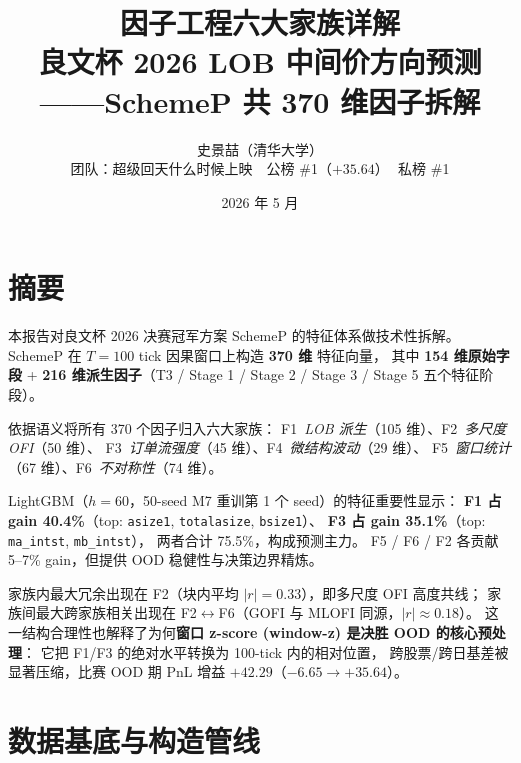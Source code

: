 \documentclass[10.5pt,a4paper]{article}
\title{\color{icmlblue}\textbf{因子工程六大家族详解}\\
\large 良文杯 2026 LOB 中间价方向预测——SchemeP 共 370 维因子拆解}
\author{史景喆（清华大学）\\
\small 团队：超级回天什么时候上映 \,\textbar\, 公榜 \#1（$+35.64$）\,\textbar\, 私榜 \#1}
\date{2026 年 5 月}
\begin{document}
\maketitle

\section{摘要}

本报告对良文杯 2026 决赛冠军方案 SchemeP 的特征体系做技术性拆解。
SchemeP 在 $T=100$ tick 因果窗口上构造 \textbf{370 维} 特征向量，
其中 \textbf{154 维原始字段} + \textbf{216 维派生因子}（T3 / Stage 1 / Stage 2 / Stage 3 / Stage 5 五个特征阶段）。

依据语义将所有 370 个因子归入六大家族：
F1~\emph{LOB 派生}（105 维）、F2~\emph{多尺度 OFI}（50 维）、
F3~\emph{订单流强度}（45 维）、F4~\emph{微结构波动}（29 维）、
F5~\emph{窗口统计}（67 维）、F6~\emph{不对称性}（74 维）。

LightGBM（$h=60$，50-seed M7 重训第 1 个 seed）的特征重要性显示：
\textbf{F1 占 gain 40.4\%}（top: \texttt{asize1}, \texttt{totalasize}, \texttt{bsize1}）、
\textbf{F3 占 gain 35.1\%}（top: \texttt{ma\_intst}, \texttt{mb\_intst}），
两者合计 75.5\%，构成预测主力。
F5 / F6 / F2 各贡献 5–7\% gain，但提供 OOD 稳健性与决策边界精炼。

家族内最大冗余出现在 F2（块内平均 $|r|=0.33$），即多尺度 OFI 高度共线；
家族间最大跨家族相关出现在 F2$\leftrightarrow$F6（GOFI 与 MLOFI 同源，$|r|\approx 0.18$）。
这一结构合理性也解释了为何\textbf{窗口 z-score (window-z) 是决胜 OOD 的核心预处理}：
它把 F1/F3 的绝对水平转换为 100-tick 内的相对位置，
跨股票/跨日基差被显著压缩，比赛 OOD 期 PnL 增益 $+42.29$（$-6.65\to+35.64$）。

\section{数据基底与构造管线}
\end{document}
